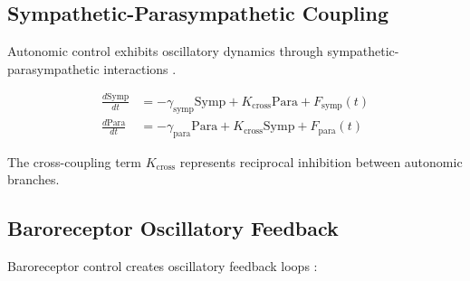 \documentclass[twocolumn]{article}
\begin{document}
\subsection{Sympathetic-Parasympathetic Coupling}

Autonomic control exhibits oscillatory dynamics through sympathetic-parasympathetic interactions \citep{parati1995spectral}.

\begin{align}
\frac{d\text{Symp}}{dt} &= -\gamma_{\text{symp}} \text{Symp} + K_{\text{cross}} \text{Para} + F_{\text{symp}}(t) \label{eq:sympathetic} \\
\frac{d\text{Para}}{dt} &= -\gamma_{\text{para}} \text{Para} + K_{\text{cross}} \text{Symp} + F_{\text{para}}(t) \label{eq:parasympathetic}
\end{align}

The cross-coupling term $K_{\text{cross}}$ represents reciprocal inhibition between autonomic branches.

\subsection{Baroreceptor Oscillatory Feedback}

Baroreceptor control creates oscillatory feedback loops \citep{chapleau1995methods}:
\end{document}
